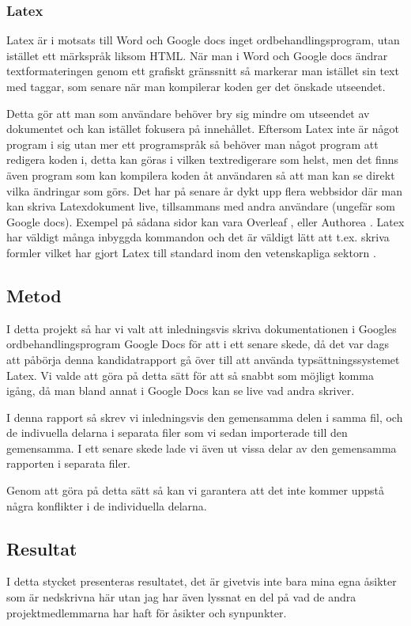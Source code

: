 \subsubsection{Latex}
Latex är i motsats till Word och Google docs inget ordbehandlingsprogram, utan istället ett märkspråk liksom HTML. När man i Word och Google docs ändrar textformateringen genom ett grafiskt gränssnitt så markerar man istället sin text med taggar, som senare när man kompilerar koden ger det önskade utseendet. 

	
Detta gör att man som användare behöver bry sig mindre om utseendet av dokumentet och kan istället fokusera på innehållet. Eftersom Latex inte är något program i sig utan mer ett programspråk så behöver man något program att redigera koden i, detta kan göras i vilken textredigerare som helst, men det finns även program som kan kompilera koden åt användaren så att man kan se direkt vilka ändringar som görs. Det har på senare år dykt upp flera webbsidor där man kan skriva Latexdokument live, tillsammans med andra användare (ungefär som Google docs). Exempel på sådana sidor kan vara Overleaf \cite{overleaf}, eller Authorea \cite{authorea}. Latex har väldigt många inbyggda kommandon och det är väldigt lätt att t.ex. skriva formler vilket har gjort Latex till standard inom den vetenskapliga sektorn \cite{latex_standard}.


\subsection{Metod}
I detta projekt så har vi valt att inledningsvis skriva dokumentationen i Googles ordbehandlingsprogram Google Docs för att i ett senare skede, då det var dags att påbörja denna kandidatrapport gå över till att använda typsättningssystemet Latex. Vi valde att göra på detta sätt för att så snabbt som möjligt komma igång, då man bland annat i Google Docs kan se live vad andra skriver.

I denna rapport så skrev vi inledningsvis den gemensamma delen i samma fil, och de indivuella delarna i separata filer som vi sedan importerade till den gemensamma. I ett senare skede lade vi även ut vissa delar av den gemensamma rapporten i separata filer.

Genom att göra på detta sätt så kan vi garantera att det inte kommer uppstå några konflikter i de individuella delarna.

\subsection{Resultat}
I detta stycket presenteras resultatet, det är givetvis inte bara mina egna åsikter som är nedskrivna här utan jag har även lyssnat en del på vad de andra projektmedlemmarna har haft för åsikter och synpunkter.

